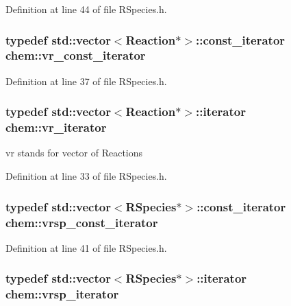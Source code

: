 Definition at line 44 of file R\-Species.\-h.

\hypertarget{namespacechem_a39d00f277b52572f1ab739d5354509f9}{
\subsubsection[{vr\-\_\-const\-\_\-iterator}]{\setlength{\rightskip}{0pt plus 5cm}typedef std\-::vector$<${\bf Reaction}$\ast$$>$\-::const\-\_\-iterator {\bf chem\-::vr\-\_\-const\-\_\-iterator}}}\label{namespacechem_a39d00f277b52572f1ab739d5354509f9}


Definition at line 37 of file R\-Species.\-h.

\hypertarget{namespacechem_a6c6fe26056b061cb8512c46063ad758e}{
\subsubsection[{vr\-\_\-iterator}]{\setlength{\rightskip}{0pt plus 5cm}typedef std\-::vector$<${\bf Reaction}$\ast$$>$\-::iterator {\bf chem\-::vr\-\_\-iterator}}}\label{namespacechem_a6c6fe26056b061cb8512c46063ad758e}


vr stands for vector of Reactions 



Definition at line 33 of file R\-Species.\-h.

\hypertarget{namespacechem_ab6ba36c9953625b15ff4105e1cdfdb86}{
\subsubsection[{vrsp\-\_\-const\-\_\-iterator}]{\setlength{\rightskip}{0pt plus 5cm}typedef std\-::vector$<${\bf R\-Species}$\ast$$>$\-::const\-\_\-iterator {\bf chem\-::vrsp\-\_\-const\-\_\-iterator}}}\label{namespacechem_ab6ba36c9953625b15ff4105e1cdfdb86}


Definition at line 41 of file R\-Species.\-h.

\hypertarget{namespacechem_a9b02b32d43473a3cd87fd30f910cc121}{
\subsubsection[{vrsp\-\_\-iterator}]{\setlength{\rightskip}{0pt plus 5cm}typedef std\-::vector$<${\bf R\-Species}$\ast$$>$\-::iterator {\bf chem\-::vrsp\-\_\-iterator}}}\label{namespacechem_a9b02b32d43473a3cd87fd30f910cc121}


